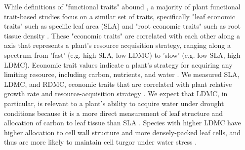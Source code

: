 \documentclass[12pt, letterpaper]{article}
\begin{document}
While definitions of "functional traits" abound \citep{Violle2007, Volaire2020WhatProcesses, Mcgill2006}, a majority of plant functional trait-based studies focus on a similar set of traits, specifically "leaf economic traits" such as specific leaf area (SLA) \citep{Wright2004, Reich2014} and "root economic traits" such as root tissue density \citep{Kramer-Walter2016}. These "economic traits" are correlated with each other along a axis that represents a plant’s resource acquisition strategy, ranging along a spectrum from ’fast’ (e.g. high SLA, low LDMC) to ’slow’ (e.g. low SLA, high LDMC). Economic trait values indicate a plant’s strategy for acquiring any limiting resource, including carbon, nutrients, and water \citep{Reich2014}. We measured SLA, LDMC, and RDMC, economic traits that are correlated with plant relative growth rate and resource-acquisition strategy \citep{Weiher1999ChallengingEcology}. We expect that LDMC, in particular, is relevant to a plant’s ability to acquire water under drought conditions because it is a more direct measurement of leaf structure and allocation of carbon to leaf tissue than SLA \citep{Niinemets1999ComponentsPlants, Hodgson2011}. Species with higher LDMC have higher allocation to cell wall structure and more densely-packed leaf cells, and thus are more likely to maintain cell turgor under water stress \citep{Niinemets2001Global-scaleShrubs, Poorter2009CausesMeta-analysis, Wilcox2020PlantPrairie}.
\end{document}
